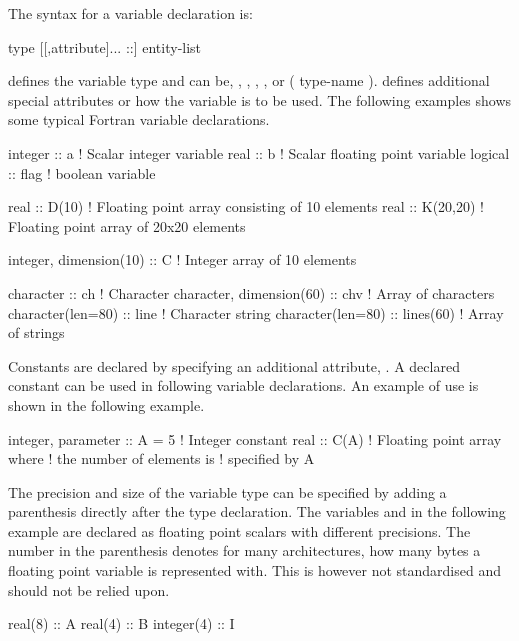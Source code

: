 The syntax for a variable declaration is:

\begin{fsyntax}
type [[,attribute]... ::] entity-list
\end{fsyntax}

 defines the variable type and can be, , , , , or ( type-name ).  defines additional special attributes or how the variable is to be used. The following examples shows
some typical Fortran variable declarations.

\begin{fortrancodeenv}
integer :: a     ! Scalar integer variable
real    :: b     ! Scalar floating point variable
logical :: flag  ! boolean variable

real :: D(10)    ! Floating point array consisting of 10 elements
real :: K(20,20) ! Floating point array of 20x20 elements

integer, dimension(10) :: C     ! Integer array of 10 elements

character :: ch                 ! Character
character, dimension(60) :: chv ! Array of characters
character(len=80) :: line       ! Character string
character(len=80) :: lines(60)  ! Array of strings
\end{fortrancodeenv}

Constants are declared by specifying an additional attribute, . A declared constant can be used in following variable declarations. An example of use is shown in the following example.

\begin{fortrancodeenv}
integer, parameter :: A = 5 ! Integer constant
real :: C(A)                ! Floating point array where
                            ! the number of elements is
                            ! specified by A
\end{fortrancodeenv}

The precision and size of the variable type can be specified by adding a parenthesis directly after the type declaration. The variables  and  in the following example are declared as floating point scalars with different precisions. The number in the parenthesis denotes for many architectures, how many bytes a floating point variable is represented with. This is however not standardised and should not be relied upon.

\begin{fortrancodeenv}
real(8) :: A
real(4) :: B
integer(4) :: I
\end{fortrancodeenv}

